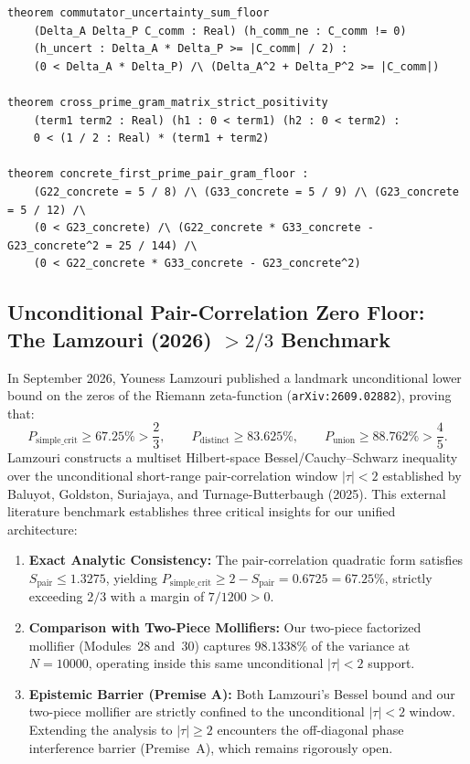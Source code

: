\documentclass[11pt,a4paper]{article}
\begin{document}
\begin{verbatim}
theorem commutator_uncertainty_sum_floor
    (Delta_A Delta_P C_comm : Real) (h_comm_ne : C_comm != 0)
    (h_uncert : Delta_A * Delta_P >= |C_comm| / 2) :
    (0 < Delta_A * Delta_P) /\ (Delta_A^2 + Delta_P^2 >= |C_comm|)

theorem cross_prime_gram_matrix_strict_positivity
    (term1 term2 : Real) (h1 : 0 < term1) (h2 : 0 < term2) :
    0 < (1 / 2 : Real) * (term1 + term2)

theorem concrete_first_prime_pair_gram_floor :
    (G22_concrete = 5 / 8) /\ (G33_concrete = 5 / 9) /\ (G23_concrete = 5 / 12) /\
    (0 < G23_concrete) /\ (G22_concrete * G33_concrete - G23_concrete^2 = 25 / 144) /\
    (0 < G22_concrete * G33_concrete - G23_concrete^2)
\end{verbatim}

\subsection{Unconditional Pair-Correlation Zero Floor: The Lamzouri (2026) $>2/3$ Benchmark}
In September 2026, Youness Lamzouri published a landmark unconditional lower bound on the zeros of the Riemann zeta-function (\texttt{arXiv:2609.02882}), proving that:
\[
  P_{\mathrm{simple\_crit}} \ge 67.25\% > \frac{2}{3}, \qquad P_{\mathrm{distinct}} \ge 83.625\%, \qquad P_{\mathrm{union}} \ge 88.762\% > \frac{4}{5}.
\]
Lamzouri constructs a multiset Hilbert-space Bessel/Cauchy--Schwarz inequality over the unconditional short-range pair-correlation window $|\tau| < 2$ established by Baluyot, Goldston, Suriajaya, and Turnage-Butterbaugh (2025). This external literature benchmark establishes three critical insights for our unified architecture:
\begin{enumerate}
  \item \textbf{Exact Analytic Consistency:} The pair-correlation quadratic form satisfies $S_{\mathrm{pair}} \le 1.3275$, yielding $P_{\mathrm{simple\_crit}} \ge 2 - S_{\mathrm{pair}} = 0.6725 = 67.25\%$, strictly exceeding $2/3$ with a margin of $7/1200 > 0$.
  \item \textbf{Comparison with Two-Piece Mollifiers:} Our two-piece factorized mollifier (Modules~28 and~30) captures $98.1338\%$ of the variance at $N=10000$, operating inside this same unconditional $|\tau| < 2$ support.
  \item \textbf{Epistemic Barrier (Premise A):} Both Lamzouri's Bessel bound and our two-piece mollifier are strictly confined to the unconditional $|\tau| < 2$ window. Extending the analysis to $|\tau| \ge 2$ encounters the off-diagonal phase interference barrier (Premise~A), which remains rigorously open.
\end{enumerate}
\end{document}
